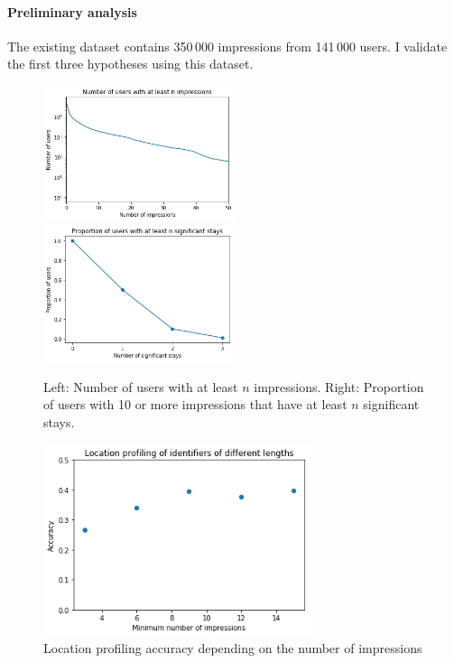 
\paragraph*{Preliminary analysis}
The existing dataset contains 350\,000 impressions from 141\,000 users. I validate the first three hypotheses using this dataset. 

\begin{figure}%
	\includegraphics[width=0.5\textwidth]{graphics/numimpressions}
	\includegraphics[width=0.5\textwidth]{graphics/sigstays}
	\caption{Left: Number of users with at least $n$ impressions. Right: Proportion of users with 10 or more impressions that have at least $n$ significant stays. }
	\label{fig:impressions}
\end{figure}

\begin{figure}%
	\centering
	\includegraphics[width=0.7\textwidth]{graphics/impressions}
	\caption{Location profiling accuracy depending on the number of impressions}
	\label{fig:impressionprofiling}
\end{figure}

